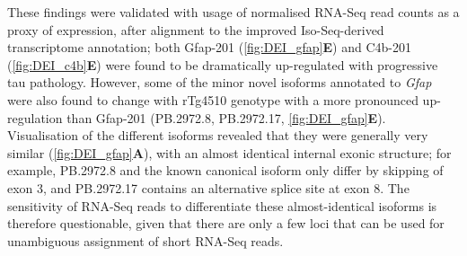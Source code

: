 These findings were validated with usage of normalised RNA-Seq read counts as a proxy of expression, after alignment to the improved Iso-Seq-derived transcriptome annotation; both Gfap-201 (\cref{fig:DEI_gfap}\textbf{E}) and C4b-201 (\cref{fig:DEI_c4b}\textbf{E}) were found to be dramatically up-regulated with progressive tau pathology. However, some of the minor novel isoforms annotated to \textit{Gfap} were also found to change with rTg4510 genotype with a more pronounced up-regulation than Gfap-201 (PB.2972.8, PB.2972.17, \cref{fig:DEI_gfap}\textbf{E}). Visualisation of the different isoforms revealed that they were generally very similar (\cref{fig:DEI_gfap}\textbf{A}), with an almost identical internal exonic structure; for example, PB.2972.8 and the known canonical isoform only differ by skipping of exon 3, and PB.2972.17 contains an alternative splice site at exon 8. The sensitivity of RNA-Seq reads to differentiate these almost-identical isoforms is therefore questionable, given that there are only a few loci that can be used for unambiguous assignment of short RNA-Seq reads.  


